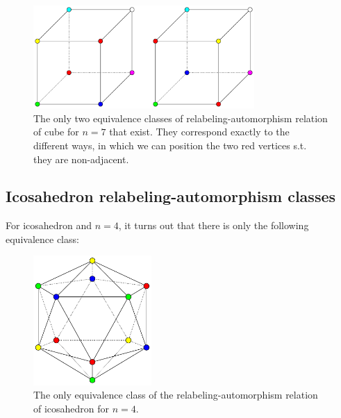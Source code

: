 \begin{figure}[H]
    \centering
    \includegraphics[width=0.75\textwidth]{Resources/Figs/cube_non_relaut-7-clrings.pdf}
    \caption{The only two equivalence classes of relabeling-automorphism relation of cube for $n=7$ that exist. They correspond exactly to the different ways, in which we can position the two red vertices s.t. they are non-adjacent.}
    \label{fig:cube-7clring-relaut-classes}
\end{figure}

\subsection{Icosahedron relabeling-automorphism classes}

For icosahedron and $n=4$, it turns out that there is only the following equivalence class:

\begin{figure}[H]
    \centering
    \includegraphics[width=0.4\textwidth]{Resources/Figs/icosahedron_non_relaut-4-clrings.pdf}
    \caption{The only equivalence class of the relabeling-automorphism relation of icosahedron for $n=4$.}
    \label{fig:icosahedron-4clring-relaut-classes}
\end{figure}

